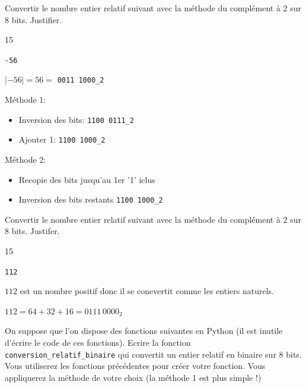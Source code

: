 \documentclass[a4paper,10pt]{report}
\def\ptsexoD{2}
\def\ptsexoE{1}
\def\ptsexoF{4}
\begin{document}
\begin{minipage}{0.49\linewidth}
 \exods{\ptsexoD}

Convertir le nombre entier relatif suivant avec la méthode du complément à 2 sur 8 bits. Justifier.
\begin{answer}{1}{5} 
    \begin{center}
        \verb|-56|
    \end{center}   

         $|-56|=56=$ \verb|0011 1000_2|
        
        Méthode 1:
        \begin{itemize}
            \item Inversion des bits: \verb|1100 0111_2|
            \item Ajouter 1: \verb|1100 1000_2|
        \end{itemize}

        Méthode 2:
        \begin{itemize}
            \item Recopie des bits jusqu'au 1er '1' iclus
            \item Inversion des bits restants \verb|1100 1000_2|
        \end{itemize}
\end{answer}

\end{minipage}\hfill
\begin{minipage}{0.49\linewidth}

     \exods{\ptsexoE}

Convertir le nombre entier relatif suivant avec la méthode du complément à 2 sur 8 bits. Justifer.
\begin{answer}{1}{5} 
    \begin{center}
        \verb|112|
    \end{center}   

    $112$ est un nombre positif donc il se conevertit comme les entiers naturels.

    $112=64+32+16=0111\,0000_2$
\end{answer}
\end{minipage}

\medskip

\pagebreak
\thispagestyle{DS_LP}
\exods{\ptsexoF}

On suppose que l'on dispose des fonctions suivantes en Python (il est inutile d'écrire le code de ces fonctions). Ecrire la fonction \texttt{conversion\_relatif\_binaire} qui convertit un entier relatif en binaire sur 8 bits. Vous utiliserez les fonctions précédentes pour créer votre fonction. 
 Vous appliquerez la méthode de votre choix (la méthode 1 est plus simple !)
\end{document}
